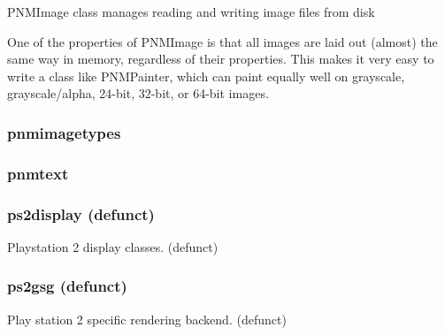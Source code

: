 \documentclass[a4paper]{article}
\begin{document}
{\color{black}
PNMImage class manages reading and writing image files from disk }

{\color{black}
One of the properties of PNMImage is that all images are laid out (almost) the same way in memory, regardless of their
properties. This makes it very easy to write a class like PNMPainter, which can paint equally well on grayscale,
grayscale/alpha, 24-bit, 32-bit, or 64-bit images. }

\clearpage\subsubsection[pnmimagetypes]{pnmimagetypes}
\hypertarget{RefHeading22131167907073}{}\subsubsection{}
\clearpage\subsubsection[pnmtext]{pnmtext}
\hypertarget{RefHeading22151167907073}{}\subsubsection{}
\clearpage\subsubsection[ps2display (defunct)]{ps2display (defunct)}
\hypertarget{RefHeading22171167907073}{}{\color{black}
Playstation 2 display classes. (defunct)}

\clearpage\subsubsection[ps2gsg (defunct)]{ps2gsg (defunct)}
\hypertarget{RefHeading22191167907073}{}{\color{black}
Play station 2 specific rendering backend. (defunct)}
\end{document}
